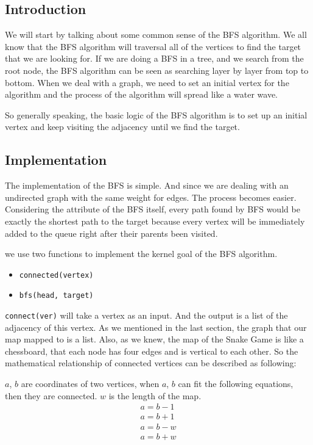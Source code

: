 \documentclass[12pt]{article}
\begin{document}
\subsection{Introduction}
We will start by talking about some common sense of the BFS algorithm. We all know that the BFS algorithm will traversal all of the vertices to find the target that we are looking for. If we are doing a BFS in a tree, and we search from the root node, the BFS algorithm can be seen as searching layer by layer from top to bottom. When we deal with a graph, we need to set an initial vertex for the algorithm and the process of the algorithm will spread like a water wave.

So generally speaking, the basic logic of the BFS algorithm is to set up an initial vertex and keep visiting the adjacency until we find the target. 

\subsection{Implementation}
The implementation of the BFS is simple. And since we are dealing with an undirected graph with the same weight for edges. The process becomes easier. Considering the attribute of the BFS itself, every path found by BFS would be exactly the shortest path to the target because every vertex will be immediately added to the queue right after their parents been visited.

we use two functions to implement the kernel goal of the BFS algorithm. 
\begin{itemize}
    \item \verb|connected(vertex)|
    \item \verb|bfs(head, target)|
\end{itemize}

\verb|connect(ver)| will take a vertex as an input. And the output is a list of the adjacency of this vertex. As we mentioned in the last section, the graph that our map mapped to is a list. Also, as we knew, the map of the Snake Game is like a chessboard, that each node has four edges and is vertical to each other. So the mathematical relationship of connected vertices can be described as following:

$a$, $b$ are coordinates of two vertices, when $a$, $b$ can fit the following equations, then they
are connected. $w$ is the length of the map.
\begin{eqnarray}
        a = b - 1 \\
        a = b + 1 \\
        a = b - w \\
        a = b + w 
\end{eqnarray}
\end{document}
